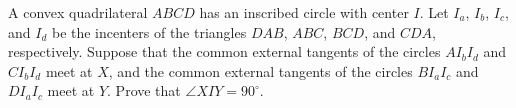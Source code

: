 A convex quadrilateral $ABCD$ has an inscribed circle with center $I$. Let $I_a$, $I_b$, $I_c$, and $I_d$ be the incenters of the triangles $DAB$, $ABC$, $BCD$, and $CDA$, respectively. Suppose that the common external tangents of the circles $AI_bI_d$ and $CI_bI_d$ meet at $X$, and the common external tangents of the circles $BI_aI_c$ and $DI_aI_c$ meet at $Y$. Prove that $\angle XIY = 90^\circ$.
